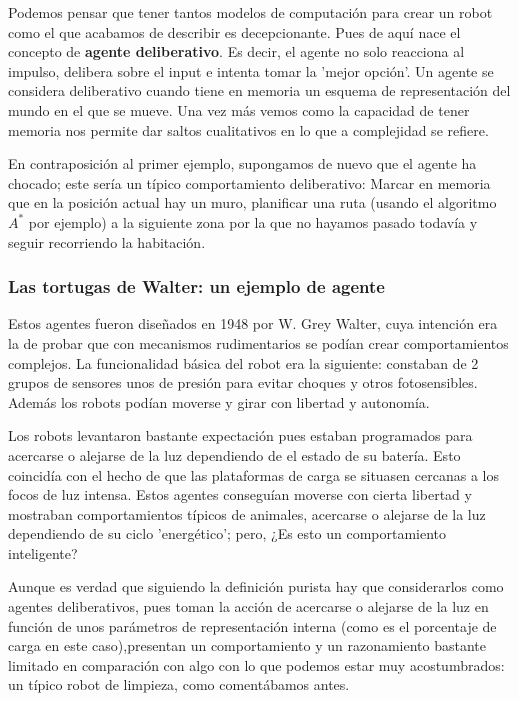 \vspace{10px}

Podemos pensar que tener tantos modelos de computación para crear un robot como el que acabamos de describir es decepcionante. Pues de aquí nace el concepto de \textbf{agente deliberativo}. Es decir, el agente no solo reacciona al impulso, delibera sobre el input e intenta tomar la 'mejor opción'. Un agente se considera deliberativo cuando tiene en memoria un esquema de representación del mundo en el que se mueve. Una vez más vemos como la capacidad de tener memoria nos permite dar saltos cualitativos en lo que a complejidad se refiere.

\vspace{10px}

En contraposición al primer ejemplo, supongamos de nuevo que el agente ha chocado; este sería un típico comportamiento deliberativo: Marcar en memoria que en la posición actual hay un muro, planificar una ruta (usando el algoritmo $A^*$ por ejemplo) a la siguiente zona por la que no hayamos pasado todavía y seguir recorriendo la habitación.

\subsubsection{Las tortugas de Walter: un ejemplo de agente}

Estos agentes fueron diseñados en 1948 por W. Grey Walter, cuya intención era la de probar que con mecanismos rudimentarios se podían crear comportamientos complejos. La funcionalidad básica del robot era la siguiente: constaban de 2 grupos de sensores unos de presión para evitar choques y otros fotosensibles. Además los robots podían moverse y girar con libertad y autonomía.

\vspace{10px}

Los robots levantaron bastante expectación pues estaban programados para acercarse o alejarse de la luz dependiendo de el estado de su batería. Esto coincidía con el hecho de que las plataformas de carga se situasen cercanas a los focos de luz intensa. Estos agentes conseguían moverse con cierta libertad y mostraban comportamientos típicos de animales, acercarse o alejarse de la luz dependiendo de su ciclo 'energético'; pero, ¿Es esto un comportamiento inteligente?

\vspace{10px}

Aunque es verdad que siguiendo la definición purista hay que considerarlos como agentes deliberativos, pues toman la acción de acercarse o alejarse de la luz en función de unos parámetros de representación interna (como es el porcentaje de carga en este caso),presentan un comportamiento y un razonamiento bastante limitado en comparación con algo con lo que podemos estar muy acostumbrados: un típico robot de limpieza, como comentábamos antes.

